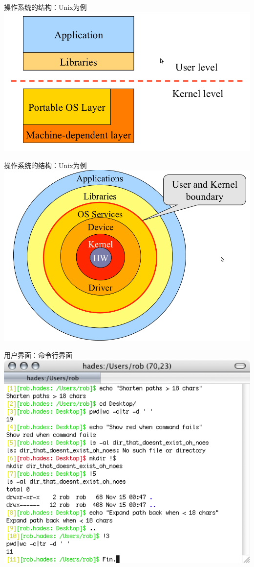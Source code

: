 \documentclass[xcolor=svgnames]{beamer}
\begin{document}
\begin{CJK*}{UTF8}{gbsn}
\begin{frame}{操作系统的结构：Unix为例}
\includegraphics[width=1.0\textwidth]{structure.png}
\end{frame}

\begin{frame}{操作系统的结构：Unix为例}
\includegraphics[width=1.0\textwidth]{onion.png}
\end{frame}

\begin{frame}{用户界面：命令行界面}
\includegraphics[width=1.0\textwidth]{bash.png}
\end{frame}


\end{CJK*}
\end{document}
